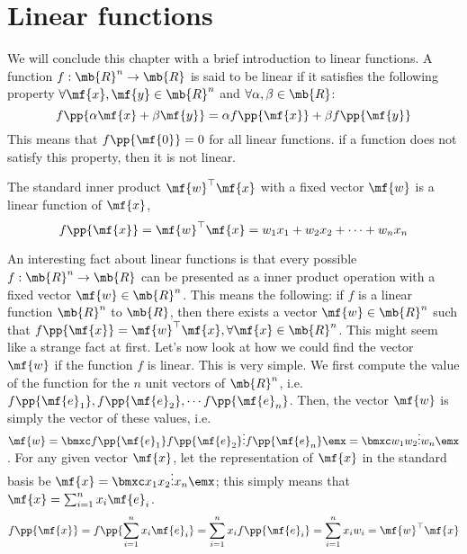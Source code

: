 \section{Linear functions}\label{sec:ch01-lin-func}
We will conclude this chapter with a brief introduction to linear functions. A function $f: \mb{R}^n \to \mb{R}$ is said to be linear if it satisfies the following property $\forall \mf{x}, \mf{y} \in \mb{R}^n$ and $\forall \alpha, \beta \in \mb{R}$:
\begin{equation}
    f\pp{\alpha \mf{x} + \beta \mf{y}} = \alpha f\pp{\mf{x}} + \beta f\pp{\mf{y}}
    \label{eq:linear-func-superpos}
\end{equation}
This means that $f\pp{\mf{0}} = 0$ for all linear functions. if a function does not satisfy this property, then it is not linear.

The standard inner product $\mf{w}^\top\mf{x}$ with a fixed  vector $\mf{w}$ is a linear function of $\mf{x}$,
\[ f\pp{\mf{x}} = \mf{w}^\top \mf{x} = w_1x_1 + w_2x_2 + \cdots + w_nx_n \]

An interesting fact about linear functions is that every possible $f: \mb{R}^n \to \mb{R}$ can be presented as a inner product operation with a fixed vector $\mf{w} \in \mb{R}^n$. This means the following: if $f$ is a linear function $\mb{R}^n$ to $\mb{R}$, then there exists a vector $\mf{w} \in \mb{R}^n$ such that $f\pp{\mf{x}} = \mf{w}^\top\mf{x}, \forall \mf{x} \in \mb{R}^n$. This might seem like a strange fact at first. Let's now look at how we could find the vector $\mf{w}$ if the function $f$ is linear. This is very simple. We first compute the value of the function for the $n$ unit vectors of $\mb{R}^n$, i.e. $f\pp{\mf{e}_1}, f\pp{\mf{e}_2}, \cdots f\pp{\mf{e}_n}$. Then, the vector $\mf{w}$ is simply the vector of these values, i.e. $\mf{w} = \bmxc f\pp{\mf{e}_1} \\ f\pp{\mf{e}_2} \\ \vdots \\ f\pp{\mf{e}_n} \emx = \bmxc w_1 \\ w_2 \\ \vdots \\ w_n \emx$. For any given vector $\mf{x}$, let the representation of $\mf{x}$ in the standard basis be $\mf{x} = \bmxc x_1 \\x_2 \\ \vdots \\ x_n\emx$; this simply means that $\mf{x} = \sum_{i=1}^n x_i\mf{e}_i$.
\[ 
\begin{split}
    f\pp{\mf{x}} = f\pp{\sum_{i=1}^nx_i\mf{e}_i} = \sum_{i=1}^nx_if\pp{\mf{e}_i} = \sum_{i=1}^nx_iw_i = \mf{w}^\top\mf{x}
\end{split}
\]


